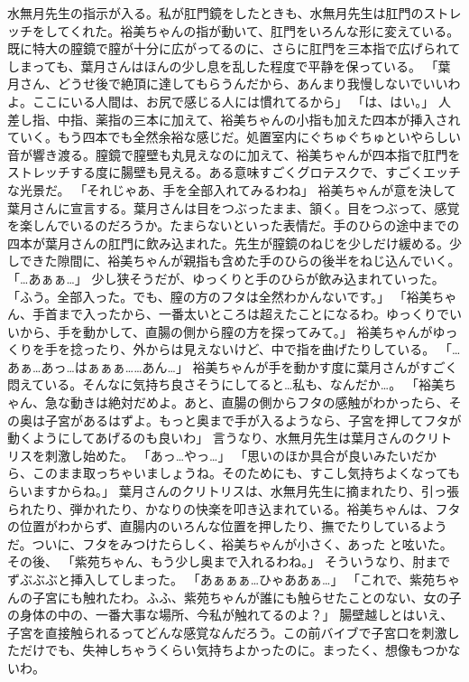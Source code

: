 水無月先生の指示が入る。私が肛門鏡をしたときも、水無月先生は肛門のストレッチをしてくれた。裕美ちゃんの指が動いて、肛門をいろんな形に変えている。既に特大の膣鏡で膣が十分に広がってるのに、さらに肛門を三本指で広げられてしまっても、葉月さんはほんの少し息を乱した程度で平静を保っている。
「葉月さん、どうせ後で絶頂に達してもらうんだから、あんまり我慢しないでいいわよ。ここにいる人間は、お尻で感じる人には慣れてるから」
「は、はい。」
人差し指、中指、薬指の三本に加えて、裕美ちゃんの小指も加えた四本が挿入されていく。もう四本でも全然余裕な感じだ。処置室内にぐちゅぐちゅといやらしい音が響き渡る。膣鏡で膣壁も丸見えなのに加えて、裕美ちゃんが四本指で肛門をストレッチする度に腸壁も見える。ある意味すごくグロテスクで、すごくエッチな光景だ。
「それじゃあ、手を全部入れてみるわね」
裕美ちゃんが意を決して葉月さんに宣言する。葉月さんは目をつぶったまま、頷く。目をつぶって、感覚を楽しんでいるのだろうか。たまらないといった表情だ。手のひらの途中までの四本が葉月さんの肛門に飲み込まれた。先生が膣鏡のねじを少しだけ緩める。少しできた隙間に、裕美ちゃんが親指も含めた手のひらの後半をねじ込んでいく。
「…あぁぁ…」
少し狭そうだが、ゆっくりと手のひらが飲み込まれていった。
「ふう。全部入った。でも、膣の方のフタは全然わかんないです。」
「裕美ちゃん、手首まで入ったから、一番太いところは超えたことになるわ。ゆっくりでいいから、手を動かして、直腸の側から膣の方を探ってみて。」
裕美ちゃんがゆっくりを手を捻ったり、外からは見えないけど、中で指を曲げたりしている。
「…あぁ…あっ…はぁぁぁ……あん…」
裕美ちゃんが手を動かす度に葉月さんがすごく悶えている。そんなに気持ち良さそうにしてると…私も、なんだか…。
「裕美ちゃん、急な動きは絶対だめよ。あと、直腸の側からフタの感触がわかったら、その奥は子宮があるはずよ。もっと奥まで手が入るようなら、子宮を押してフタが動くようにしてあげるのも良いわ」
言うなり、水無月先生は葉月さんのクリトリスを刺激し始めた。
「あっ…やっ…」
「思いのほか具合が良いみたいだから、このまま取っちゃいましょうね。そのためにも、すこし気持ちよくなってもらいますからね。」
葉月さんのクリトリスは、水無月先生に摘まれたり、引っ張られたり、弾かれたり、かなりの快楽を叩き込まれている。裕美ちゃんは、フタの位置がわからず、直腸内のいろんな位置を押したり、撫でたりしているようだ。ついに、フタをみつけたらしく、裕美ちゃんが小さく、あった と呟いた。その後、
「紫苑ちゃん、もう少し奥まで入れるわね。」
そういうなり、肘までずぶぶぶと挿入してしまった。
「あぁぁぁ…ひゃああぁ…」
「これで、紫苑ちゃんの子宮にも触れたわ。ふふ、紫苑ちゃんが誰にも触らせたことのない、女の子の身体の中の、一番大事な場所、今私が触れてるのよ？」
腸壁越しとはいえ、子宮を直接触られるってどんな感覚なんだろう。この前バイブで子宮口を刺激しただけでも、失神しちゃうくらい気持ちよかったのに。まったく、想像もつかないわ。
